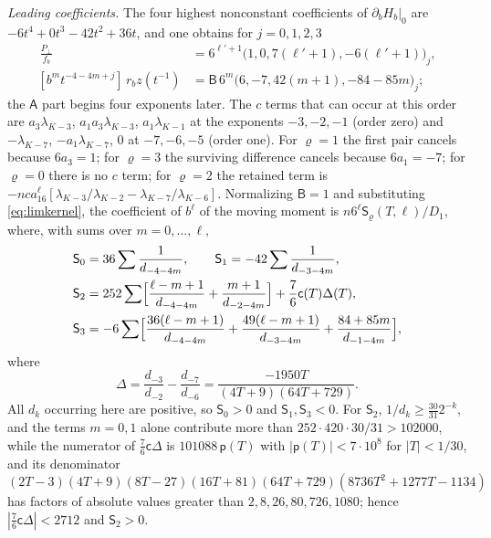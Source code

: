 \documentclass{amsart}
\theoremstyle{definition}
\theoremstyle{remark}
\numberwithin{equation}{section}
\begin{document}
\emph{Leading coefficients.} The four highest nonconstant coefficients of
$\partial_bH_b|_0$ are $-6t^4+0t^3-42t^2+36t$, and one obtains for $j=0,1,2,3$
\begin{align*}
  [b^{\ell'}t^{11+4\ell'-j}]\,\frac{P_\perp}{f_b}&=6^{\ell'+1}\bigl(1,0,7(\ell'+1),
  -6(\ell'+1)\bigr)_j,\\
  [b^mt^{-4-4m+j}]\,r_bz(t^{-1})&=\mathsf B\,6^m\bigl(6,-7,42(m+1),-84-85m\bigr)_j ;
\end{align*}
the $\mathsf A$ part begins four exponents later. The $c$ terms that can occur at this
order are $a_3\lambda_{K-3}$, $a_1a_3\lambda_{K-3}$, $a_1\lambda_{K-1}$ at the exponents
$-3,-2,-1$ (order zero) and $-\lambda_{K-7}$, $-a_1\lambda_{K-7}$, $0$ at $-7,-6,-5$
(order one). For $\varrho=1$ the first pair cancels because $6a_3=1$; for $\varrho=3$
the surviving difference cancels because $6a_1=-7$; for $\varrho=0$ there is no $c$
term; for $\varrho=2$ the retained term is
$-nca_16^\ell[\lambda_{K-3}/\lambda_{K-2}-\lambda_{K-7}/\lambda_{K-6}]$. Normalizing
$\mathsf B=1$ and substituting \eqref{eq:limkernel}, the coefficient of $b^\ell$ of the
moving moment is $n6^\ell\mathsf S_\varrho(T,\ell)/D_1$, where, with sums over
$m=0,\dots,\ell$,
\begin{align*}
  \mathsf S_0&=36\sum\frac1{d_{-4-4m}},\qquad
  \mathsf S_1=-42\sum\frac1{d_{-3-4m}},\\
  \mathsf S_2&=252\sum\Bigl[\frac{\ell-m+1}{d_{-4-4m}}+\frac{m+1}{d_{-2-4m}}\Bigr]
   +\frac76\mathsf c(T)\Delta(T),\\
  \mathsf S_3&=-6\sum\Bigl[\frac{36(\ell-m+1)}{d_{-4-4m}}
   +\frac{49(\ell-m+1)}{d_{-3-4m}}+\frac{84+85m}{d_{-1-4m}}\Bigr],
\end{align*}
where
\[
  \Delta=\frac{d_{-3}}{d_{-2}}-\frac{d_{-7}}{d_{-6}}=\frac{-1950T}{(4T+9)(64T+729)} .
\]
All $d_k$ occurring here are positive, so $\mathsf S_0>0$ and $\mathsf S_1,\mathsf S_3<0$.
For $\mathsf S_2$, $1/d_k\ge\frac{30}{31}2^{-k}$, and the terms $m=0,1$ alone contribute
more than $252\cdot420\cdot30/31>102000$, while the numerator of
$\frac76\mathsf c\Delta$ is $101088\,\mathsf p(T)$ with $|\mathsf p(T)|<7\cdot10^8$ for
$|T|<1/30$, and its denominator
$(2T-3)(4T+9)(8T-27)(16T+81)(64T+729)(8736T^2+1277T-1134)$ has factors of absolute
values greater than $2,8,26,80,726,1080$; hence $|\frac76\mathsf c\Delta|<2712$ and
$\mathsf S_2>0$.
\end{document}
